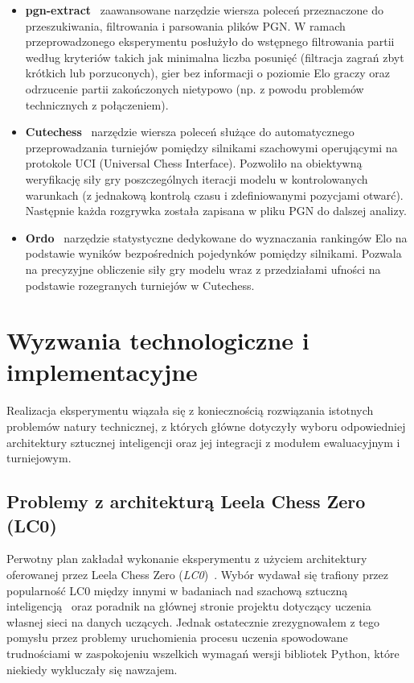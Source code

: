 \documentclass[12pt,a4paper]{report}
\begin{document}
\begin{itemize}
    \item \textbf{pgn-extract}~\cite{pgnextract} zaawansowane narzędzie wiersza poleceń przeznaczone do przeszukiwania, filtrowania i parsowania plików PGN. W ramach przeprowadzonego eksperymentu posłużyło do wstępnego filtrowania partii według kryteriów takich jak minimalna liczba posunięć (filtracja zagrań zbyt krótkich lub porzuconych), gier bez informacji o poziomie Elo graczy oraz odrzucenie partii zakończonych nietypowo (np. z powodu problemów technicznych z połączeniem).
    \item \textbf{Cutechess}~\cite{cutechess} narzędzie wiersza poleceń służące do automatycznego przeprowadzania turniejów pomiędzy silnikami szachowymi operującymi na protokole UCI (Universal Chess Interface). Pozwoliło na obiektywną weryfikację siły gry poszczególnych iteracji modelu w kontrolowanych warunkach (z jednakową kontrolą czasu i zdefiniowanymi pozycjami otwarć). Następnie każda rozgrywka została zapisana w pliku PGN do dalszej analizy.
    \item \textbf{Ordo}~\cite{ordo} narzędzie statystyczne dedykowane do wyznaczania rankingów Elo na podstawie wyników bezpośrednich pojedynków pomiędzy silnikami. Pozwala na precyzyjne obliczenie siły gry modelu wraz z przedziałami ufności na podstawie rozegranych turniejów w Cutechess.
\end{itemize}

\section{Wyzwania technologiczne i implementacyjne}

Realizacja eksperymentu wiązała się z koniecznością rozwiązania istotnych problemów natury technicznej, z których główne dotyczyły wyboru odpowiedniej architektury sztucznej inteligencji oraz jej integracji z modułem ewaluacyjnym i turniejowym.

\subsection{Problemy z architekturą Leela Chess Zero (LC0)}

Perwotny plan zakładał wykonanie eksperymentu z użyciem architektury oferowanej przez Leela Chess Zero (\textit{LC0})~\cite{lc0}. Wybór wydawał się trafiony przez popularność LC0 między innymi w badaniach nad szachową sztuczną inteligencją~\cite{silver2018alphazero} oraz poradnik na głównej stronie projektu dotyczący uczenia własnej sieci na danych uczących. Jednak ostatecznie zrezygnowałem z tego pomysłu przez problemy uruchomienia procesu uczenia spowodowane trudnościami w zaspokojeniu wszelkich wymagań wersji bibliotek Python, które niekiedy wykluczały się nawzajem.
\end{document}
